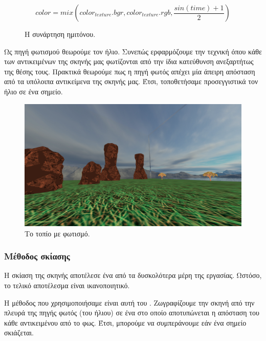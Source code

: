 \documentclass[11pt]{scrartcl} %
\newenvironment{centerimg}[1]%
{%
    \begin{figure}[H]
        #1
    \begin{center}
}%
{%
    \end{center}
    \end{figure}
}
\begin{document}
\begin{equation}
    color = mix(color_{texture}.bgr, color_{texture}.rgb, \frac{sin(time) + 1}{2})
\end{equation}

\begin{figure}[H]
    \begin{center}
        \caption{Η συνάρτηση ημιτόνου.}
        \end{center}
\end{figure}

Ως πηγή φωτισμού θεωρούμε τον ήλιο. Συνεπώς ερφαρμόζουμε την τεχνική  όπου 
κάθε  των αντικειμένων της σκηνής μας φωτίζονται από την ίδια κατεύθυνση ανεξαρτήτως της θέσης τους.
Πρακτικά θεωρούμε πως η πηγή φωτός απέχει μία άπειρη απόσταση από τα υπόλοιπα αντικείμενα της σκηνής μας.
Έτσι, τοποθετήσαμε προσεγγιστικά τον ήλιο σε ένα  σημείο. 

\begin{centerimg}{\caption{Το τοπίο με φωτισμό.}}
    \includegraphics[width=.7\textwidth]{./assets/lighting.png}
\end{centerimg}

\subsubsection{Μέθοδος σκίασης}

Η σκίαση της σκηνής αποτέλεσε ένα από τα δυσκολότερα μέρη της εργασίας. Ωστόσο, το τελικό αποτέλεσμα 
είναι ικανοποιητικό. 

Η μέθοδος που χρησιμοποιήσαμε είναι αυτή του . Ζωγραφίζουμε την σκηνή από την πλευρά 
της πηγής φωτός (του ήλιου) σε ένα  στο οποίο αποτυπώνεται η απόσταση του κάθε αντικειμένου 
από το φως. Έτσι, μπορούμε να συμπεράνουμε εάν ένα σημείο σκιάζεται. 
\end{document}
